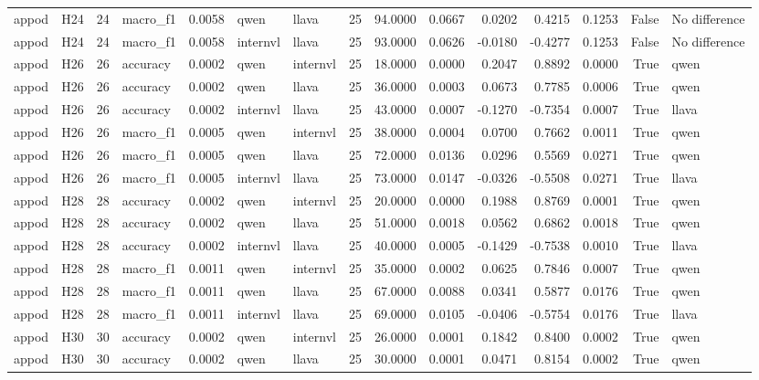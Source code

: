 \begin{table}[tbp]
\begin{tabular}{llrlrllrrrrrrrl}
appod & H24 & 24 & macro\_f1 & 0.0058 & qwen & llava & 25 & 94.0000 & 0.0667 & 0.0202 & 0.4215 & 0.1253 & False & No difference \\
appod & H24 & 24 & macro\_f1 & 0.0058 & internvl & llava & 25 & 93.0000 & 0.0626 & -0.0180 & -0.4277 & 0.1253 & False & No difference \\
appod & H26 & 26 & accuracy & 0.0002 & qwen & internvl & 25 & 18.0000 & 0.0000 & 0.2047 & 0.8892 & 0.0000 & True & qwen \\
appod & H26 & 26 & accuracy & 0.0002 & qwen & llava & 25 & 36.0000 & 0.0003 & 0.0673 & 0.7785 & 0.0006 & True & qwen \\
appod & H26 & 26 & accuracy & 0.0002 & internvl & llava & 25 & 43.0000 & 0.0007 & -0.1270 & -0.7354 & 0.0007 & True & llava \\
appod & H26 & 26 & macro\_f1 & 0.0005 & qwen & internvl & 25 & 38.0000 & 0.0004 & 0.0700 & 0.7662 & 0.0011 & True & qwen \\
appod & H26 & 26 & macro\_f1 & 0.0005 & qwen & llava & 25 & 72.0000 & 0.0136 & 0.0296 & 0.5569 & 0.0271 & True & qwen \\
appod & H26 & 26 & macro\_f1 & 0.0005 & internvl & llava & 25 & 73.0000 & 0.0147 & -0.0326 & -0.5508 & 0.0271 & True & llava \\
appod & H28 & 28 & accuracy & 0.0002 & qwen & internvl & 25 & 20.0000 & 0.0000 & 0.1988 & 0.8769 & 0.0001 & True & qwen \\
appod & H28 & 28 & accuracy & 0.0002 & qwen & llava & 25 & 51.0000 & 0.0018 & 0.0562 & 0.6862 & 0.0018 & True & qwen \\
appod & H28 & 28 & accuracy & 0.0002 & internvl & llava & 25 & 40.0000 & 0.0005 & -0.1429 & -0.7538 & 0.0010 & True & llava \\
appod & H28 & 28 & macro\_f1 & 0.0011 & qwen & internvl & 25 & 35.0000 & 0.0002 & 0.0625 & 0.7846 & 0.0007 & True & qwen \\
appod & H28 & 28 & macro\_f1 & 0.0011 & qwen & llava & 25 & 67.0000 & 0.0088 & 0.0341 & 0.5877 & 0.0176 & True & qwen \\
appod & H28 & 28 & macro\_f1 & 0.0011 & internvl & llava & 25 & 69.0000 & 0.0105 & -0.0406 & -0.5754 & 0.0176 & True & llava \\
appod & H30 & 30 & accuracy & 0.0002 & qwen & internvl & 25 & 26.0000 & 0.0001 & 0.1842 & 0.8400 & 0.0002 & True & qwen \\
appod & H30 & 30 & accuracy & 0.0002 & qwen & llava & 25 & 30.0000 & 0.0001 & 0.0471 & 0.8154 & 0.0002 & True & qwen \\

\end{tabular}
\end{table}
